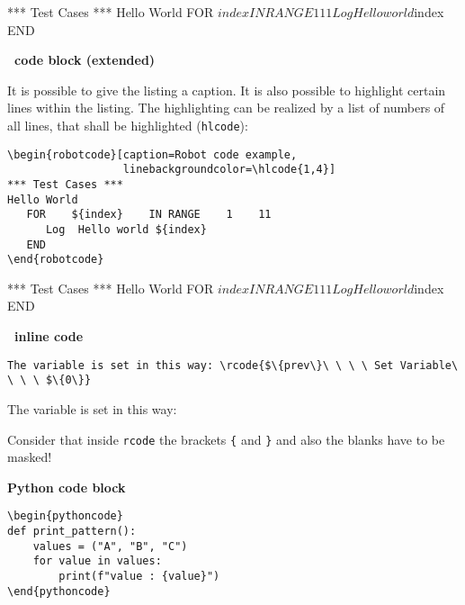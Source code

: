 \documentclass[a4paper,10pt]{report}
\begin{document}
\begin{robotcode}
*** Test Cases ***
Hello World
   FOR    ${index}    IN RANGE    1    11
      Log  Hello world ${index}
   END
\end{robotcode}

\newpage

\textbf{\rfw\ code block (extended)}

It is possible to give the listing a caption. It is also possible to highlight certain lines within the listing. The highlighting can be realized by a list
of numbers of all lines, that shall be highlighted (\texttt{hlcode}):

\begin{verbatim}
\begin{robotcode}[caption=Robot code example, 
                  linebackgroundcolor=\hlcode{1,4}]
*** Test Cases ***
Hello World
   FOR    ${index}    IN RANGE    1    11
      Log  Hello world ${index}
   END
\end{robotcode}
\end{verbatim}

\vspace{2ex}

\begin{robotcode}[caption=Robot code example,
                  linebackgroundcolor=\hlcode{1,4}]
*** Test Cases ***
Hello World
   FOR    ${index}    IN RANGE    1    11
      Log  Hello world ${index}
   END
\end{robotcode}

\vspace{2ex}

\textbf{\rfw\ inline code}
\begin{verbatim}
The variable is set in this way: \rcode{$\{prev\}\ \ \ \ Set Variable\ \ \ \ $\{0\}}
\end{verbatim}

The variable is set in this way: 

Consider that inside \texttt{rcode} the brackets \texttt{\{} and \texttt{\}} and also the blanks have to be masked!

\vspace{2ex}

\textbf{Python code block}
\begin{verbatim}
\begin{pythoncode}
def print_pattern():
    values = ("A", "B", "C")
    for value in values:
        print(f"value : {value}")
\end{pythoncode}
\end{verbatim}
\end{document}
